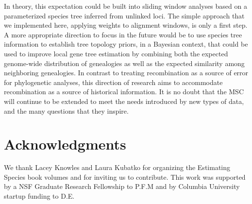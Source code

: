 \documentclass[11pt]{article}
\begin{document}
In theory, this expectation could be built into sliding window analyses based on a parameterized species tree inferred from unlinked loci. The simple approach that we implemented here, applying weights to alignment windows, is only a first step. A more appropriate direction to focus in the future would be to use species tree information to establish tree topology priors, in a Bayesian context, that could be used to improve local gene tree estimation by combining both the expected genome-wide distribution of genealogies as well as the expected similarity among neighboring genealogies. In contrast to treating recombination as a source of error for phylogenetic analyses, this direction of research aims to accommodate recombination as a source of historical information. It is no doubt that the MSC will continue to be extended to meet the needs introduced by new types of data, and the many questions that they inspire. 






\section*{Acknowledgments}
We thank Lacey Knowles and Laura Kubatko for organizing the Estimating Species book volumes and for inviting us to contribute. This work was supported by a NSF Graduate Research Fellowship to P.F.M and by Columbia University startup funding to D.E. 
\end{document}
